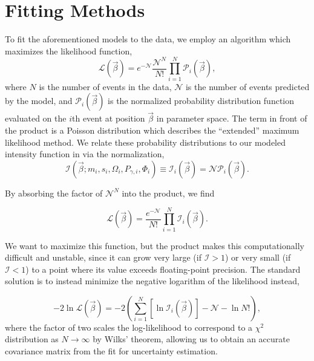 \section{Fitting Methods}\label{sec:fitting-methods}

To fit the aforementioned models to the data, we employ an algorithm which maximizes the likelihood function,
\begin{equation}
  \mathcal{L}(\vec{\beta}) = e^{-\mathcal{N}} \frac{\mathcal{N}^N}{N!} \prod_{i=1}^{N} \mathcal{P}_i(\vec{\beta}),
  \label{eq:likelihood}
\end{equation}
where $N$ is the number of events in the data, $\mathcal{N}$ is the number of events predicted by the model, and $\mathcal{P}_i(\vec{\beta})$ is the normalized probability distribution function evaluated on the $i$th event at position $\vec{\beta}$ in parameter space. The term in front of the product is a Poisson distribution which describes the ``extended'' maximum likelihood method. We relate these probability distributions to our modeled intensity function in  via the normalization,
\begin{equation}
  \mathcal{I}(\vec{\beta}; m_i, s_i, \Omega_i, P_{\gamma, i}, \Phi_i) \equiv \mathcal{I}_i(\vec{\beta}) = \mathcal{N}\mathcal{P}_i(\vec{\beta}).
\end{equation}

By absorbing the factor of $\mathcal{N}^N$ into the product, we find

\begin{equation}
  \mathcal{L}(\vec{\beta}) = \frac{e^{-\mathcal{N}}}{N!} \prod_{i=1}^{N} \mathcal{I}_i(\vec{\beta}).
\end{equation}

We want to maximize this function, but the product makes this computationally difficult and unstable, since it can grow very large (if $\mathcal{I} > 1$) or very small (if $\mathcal{I} < 1$) to a point where its value exceeds floating-point precision. The standard solution is to instead minimize the negative logarithm of the likelihood instead,

\begin{equation}
  -2 \ln \mathcal{L}(\vec{\beta}) = -2 \left(\sum_{i=1}^{N} \left[\ln \mathcal{I}_i(\vec{\beta})\right] - \mathcal{N} - \ln N! \right),
\end{equation}
where the factor of two scales the log-likelihood to correspond to a $\chi^2$ distribution as $N \to \infty$ by Wilks' theorem, allowing us to obtain an accurate covariance matrix from the fit for uncertainty estimation.

